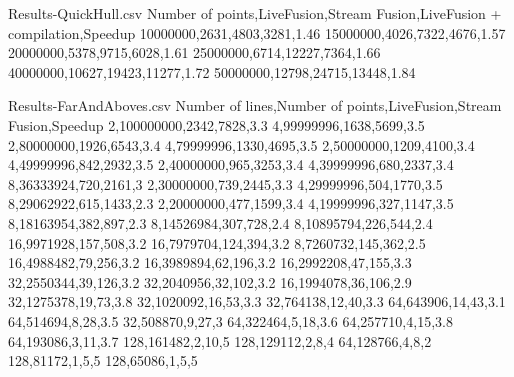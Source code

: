 \begin{filecontents*}{Results-QuickHull.csv}
Number of points,LiveFusion,Stream Fusion,LiveFusion + compilation,Speedup
10000000,2631,4803,3281,1.46
15000000,4026,7322,4676,1.57
20000000,5378,9715,6028,1.61
25000000,6714,12227,7364,1.66
40000000,10627,19423,11277,1.72
50000000,12798,24715,13448,1.84
\end{filecontents*}

\begin{filecontents*}{Results-FarAndAboves.csv}
Number of lines,Number of points,LiveFusion,Stream Fusion,Speedup
2,100000000,2342,7828,3.3
4,99999996,1638,5699,3.5
2,80000000,1926,6543,3.4
4,79999996,1330,4695,3.5
2,50000000,1209,4100,3.4
4,49999996,842,2932,3.5
2,40000000,965,3253,3.4
4,39999996,680,2337,3.4
8,36333924,720,2161,3
2,30000000,739,2445,3.3
4,29999996,504,1770,3.5
8,29062922,615,1433,2.3
2,20000000,477,1599,3.4
4,19999996,327,1147,3.5
8,18163954,382,897,2.3
8,14526984,307,728,2.4
8,10895794,226,544,2.4
16,9971928,157,508,3.2
16,7979704,124,394,3.2
8,7260732,145,362,2.5
16,4988482,79,256,3.2
16,3989894,62,196,3.2
16,2992208,47,155,3.3
32,2550344,39,126,3.2
32,2040956,32,102,3.2
16,1994078,36,106,2.9
32,1275378,19,73,3.8
32,1020092,16,53,3.3
32,764138,12,40,3.3
64,643906,14,43,3.1
64,514694,8,28,3.5
32,508870,9,27,3
64,322464,5,18,3.6
64,257710,4,15,3.8
64,193086,3,11,3.7
128,161482,2,10,5
128,129112,2,8,4
64,128766,4,8,2
128,81172,1,5,5
128,65086,1,5,5
\end{filecontents*}
